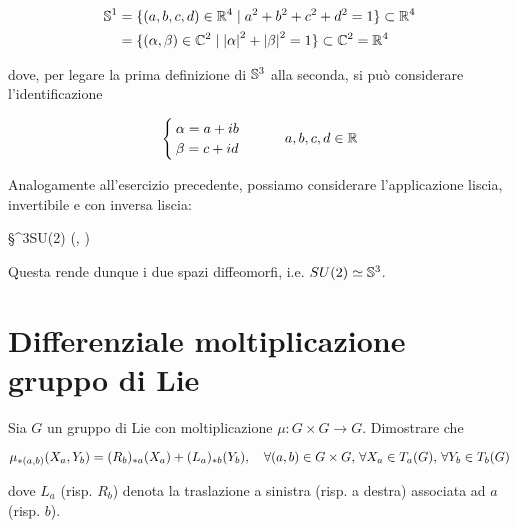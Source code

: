 \begin{align}
	\begin{split}
		\S^{1} &= \{ (a,b,c,d) \in \R^{4} \mid a^{2} + b^{2} + c^{2} + d^{2} = 1 \} \subset \R^{4} \\
		&= \{ (\alpha, \beta) \in \C^{2} \mid \abs{\alpha}^{2} + \abs{\beta}^{2} = 1 \} \subset \C^{2} = \R^{4}
	\end{split}
\end{align}

dove, per legare la prima definizione di $ \S^{3} $ alla seconda, si può considerare l'identificazione

\begin{equation}
	\begin{cases}
		\alpha = a + i b \\
		\beta = c + i d
	\end{cases} %
	\qquad a,b,c,d \in \R
\end{equation}

Analogamente all'esercizio precedente, possiamo considerare l'applicazione liscia, invertibile e con inversa liscia:

\map{\phi}
	{\S^{3}}{SU(2)}
	{(\alpha, \beta)}{\bmqty{ \alpha & - \bar{\beta} \\ \beta & \bar{\alpha} }}

Questa rende dunque i due spazi diffeomorfi, i.e. $ SU(2) \simeq \S^{3} $.

%

\newpage

%

\section{Differenziale moltiplicazione gruppo di Lie}\label{es3-7}

\begin{tcolorbox}
	Sia $ G $ un gruppo di Lie con moltiplicazione $ \mu : G \times G \to G $. Dimostrare che
	
	\begin{equation}
		\mu_{*(a,b)}(X_{a},Y_{b}) = (R_{b})_{*a}(X_{a}) + (L_{a})_{*b}(Y_{b}) %
		\qcomma \forall (a,b) \in G \times G, \, \forall X_{a} \in T_{a}(G), \, \forall Y_{b} \in T_{b}(G)
	\end{equation}
	
	dove $ L_{a} $ (risp. $ R_{b} $) denota la traslazione a sinistra (risp. a destra) associata ad $ a $ (risp. $ b $).
\end{tcolorbox}

